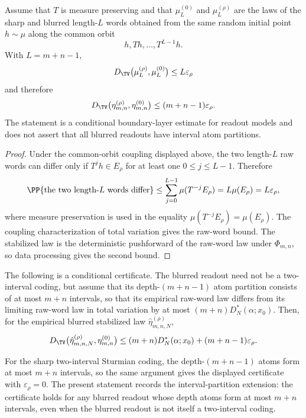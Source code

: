 \begin{proposition}\label{prop:boundary-layer}
Assume that $T$ is measure preserving and that
$\mu_L^{(0)}$ and $\mu_L^{(\rho)}$ are the laws of the sharp and blurred
length-$L$ words obtained from the same random initial point $h\sim\mu$ along
the common orbit
\[
h,Th,\ldots,T^{L-1}h .
\]
With $L=m+n-1$,
\[
D_{\TV}\bigl(\mu_L^{(\rho)},\mu_L^{(0)}\bigr)
\le L\varepsilon_\rho
\]
and therefore
\[
D_{\TV}\bigl(\eta_{m,n}^{(\rho)},\eta_{m,n}^{(0)}\bigr)
\le (m+n-1)\varepsilon_\rho .
\]
The statement is a conditional boundary-layer estimate for readout models and
does not assert that all blurred readouts have interval atom partitions.
\end{proposition}

\begin{proof}
Under the common-orbit coupling displayed above, the two length-$L$ raw words
can differ only if $T^j h\in E_\rho$ for at least one $0\le j\le L-1$.
Therefore
\[
\PP\{\text{the two length-}L\text{ words differ}\}
\le
\sum_{j=0}^{L-1}\mu(T^{-j}E_\rho)
=
L\mu(E_\rho)
=
L\varepsilon_\rho,
\]
where measure preservation is used in the equality
$\mu(T^{-j}E_\rho)=\mu(E_\rho)$. The coupling characterization of total
variation gives the raw-word bound. The stabilized law is the deterministic
pushforward of the raw-word law under $\Phi_{m,n}$, so data processing gives
the second bound.
\end{proof}

\begin{corollary}\label{cor:resolution-certificate}
The following is a conditional certificate. The blurred readout need not be a
two-interval coding, but assume that its depth-$(m+n-1)$ atom partition consists
of at most $m+n$ intervals, so that its empirical raw-word law differs from its
limiting raw-word law in total variation by at most
$(m+n)D_N^*(\alpha;x_0)$. Then, for the empirical blurred stabilized law
$\hat{\eta}_{m,n,N}^{(\rho)}$,
\[
D_{\TV}\bigl(\hat{\eta}_{m,n,N}^{(\rho)},\eta_{m,n}^{(0)}\bigr)
\le
(m+n)D_N^*(\alpha;x_0)+(m+n-1)\varepsilon_\rho.
\]
\end{corollary}

\begin{remark}
For the sharp two-interval Sturmian coding, the depth-$(m+n-1)$ atoms form at
most $m+n$ intervals, so the same argument gives the displayed certificate
with $\varepsilon_\rho=0$.  The present statement records the
interval-partition extension: the certificate holds for any blurred readout
whose depth atoms form at most $m+n$ intervals, even when the blurred readout
is not itself a two-interval coding.
\end{remark}

